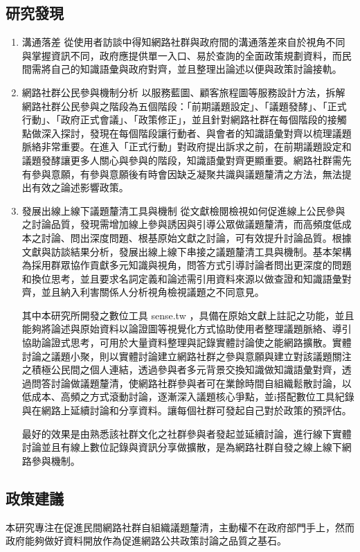\documentclass[12pt,a4paper]{article}
\begin{document}
\subsection{研究發現}
\label{sec:org08079ba}
\begin{enumerate}
\item 溝通落差
\label{sec:orgc6c92b6}
從使用者訪談中得知網路社群與政府間的溝通落差來自於視角不同與掌握資訊不同，政府應提供單一入口、易於查詢的全面政策規劃資料，而民間需將自己的知識語彙與政府對齊，並且整理出論述以便與政策討論接軌。

\item 網路社群公民參與機制分析
\label{sec:org38d1088}
以服務藍圖、顧客旅程圖等服務設計方法，拆解網路社群公民參與之階段為五個階段：「前期議題設定」、「議題發酵」、「正式行動」、「政府正式會議」、「政策修正」，並且針對網路社群在每個階段的接觸點做深入探討，發現在每個階段讓行動者、與會者的知識語彙對齊以梳理議題脈絡非常重要。在進入「正式行動」對政府提出訴求之前，在前期議題設定和議題發酵讓更多人關心與參與的階段，知識語彙對齊更顯重要。網路社群需先有參與意願，有參與意願後有時會因缺乏凝聚共識與議題釐清之方法，無法提出有效之論述影響政策。

\item 發展出線上線下議題釐清工具與機制
\label{sec:orgbc648cc}
從文獻檢閱檢視如何促進線上公民參與之討論品質，發現需增加線上參與誘因與引導公眾做議題釐清，而高頻度低成本之討論、問出深度問題、根基原始文獻之討論，可有效提升討論品質。根據文獻與訪談結果分析，發展出線上線下串接之議題釐清工具與機制。基本架構為採用群眾協作貢獻多元知識與視角，問答方式引導討論者問出更深度的問題和換位思考，並且要求名詞定義和論述需引用資料來源以做查證和知識語彙對齊，並且納入利害關係人分析視角檢視議題之不同意見。

其中本研究所開發之數位工具 sense.tw ，具備在原始文獻上註記之功能，並且能夠將論述與原始資料以論證圖等視覺化方式協助使用者整理議題脈絡、導引協助論證式思考，可用於大量資料整理與記錄實體討論使之能網路擴散。實體討論之議題小聚，則以實體討論建立網路社群之參與意願與建立對該議題關注之積極公民間之個人連結，透過參與者多元背景交換知識做知識語彙對齊，透過問答討論做議題釐清，使網路社群參與者可在業餘時間自組織鬆散討論，以低成本、高頻之方式滾動討論，逐漸深入議題核心爭點，並i搭配數位工具紀錄與在網路上延續討論和分享資料。讓每個社群可發起自己對於政策的預評估。

最好的效果是由熟悉該社群文化之社群參與者發起並延續討論，進行線下實體討論並且有線上數位記錄與資訊分享做擴散，是為網路社群自發之線上線下網路參與機制。
\end{enumerate}

\subsection{政策建議}
\label{sec:org99ceef6}
本研究專注在促進民間網路社群自組織議題釐清，主動權不在政府部門手上，然而政府能夠做好資料開放作為促進網路公共政策討論之品質之基石。
\end{document}
